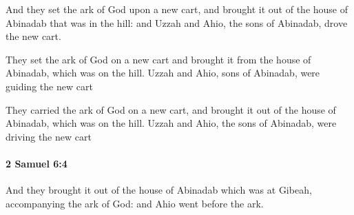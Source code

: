 			\begin{versebox}
					\item[BHS] 
					\item[ASV] And they set the ark of God upon a new cart, and brought it out of the house of Abinadab that was in the hill: and Uzzah and Ahio, the sons of Abinadab, drove the new cart.
					\item[NIV] They set the ark of God on a new cart and brought it from the house of Abinadab, which was on the hill. Uzzah and Ahio, sons of Abinadab, were guiding the new cart
					\item[NRSV] They carried the ark of God on a new cart, and brought it out of the house of Abinadab, which was on the hill. Uzzah and Ahio, the sons of Abinadab, were driving the new cart
			\end{versebox}

		\paragraph{2 Samuel 6:4} %
			\label{2SAMUEL-6-4}

			And they brought it out of the house of Abinadab which was at Gibeah, accompanying the ark of God: and Ahio went before the ark.

